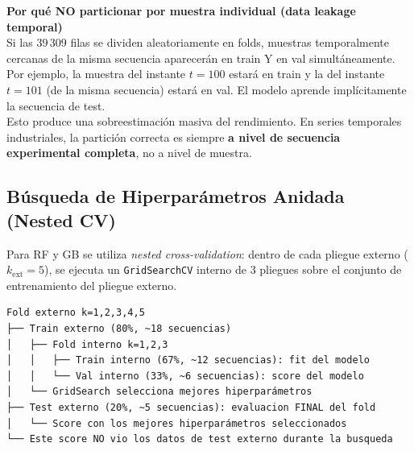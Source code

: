 \documentclass[12pt,a4paper]{article}
\begin{document}
\begin{advertenciabox}
\textbf{Por qu\'{e} NO particionar por muestra individual (data leakage temporal)}\\[4pt]
Si las 39\,309 filas se dividen aleatoriamente en folds, muestras temporalmente
cercanas de la misma secuencia aparecer\'{a}n en train Y en val simult\'{a}neamente.
Por ejemplo, la muestra del instante $t=100$ estar\'{a} en train y la del instante
$t=101$ (de la misma secuencia) estar\'{a} en val. El modelo aprende impl\'{i}citamente
la secuencia de test.\\[4pt]
Esto produce una sobreestimaci\'{o}n masiva del rendimiento. En series temporales
industriales, la partici\'{o}n correcta es siempre \textbf{a nivel de secuencia
experimental completa}, no a nivel de muestra.
\end{advertenciabox}

\subsection{B\'{u}squeda de Hiperpar\'{a}metros Anidada (Nested CV)}

Para RF y GB se utiliza \textit{nested cross-validation}: dentro de cada pliegue
externo ($k_{\text{ext}}=5$), se ejecuta un \texttt{GridSearchCV} interno de 3
pliegues sobre el conjunto de entrenamiento del pliegue externo.

\begin{center}
\begin{verbatim}
Fold externo k=1,2,3,4,5
├── Train externo (80%, ~18 secuencias)
│   ├── Fold interno k=1,2,3
│   │   ├── Train interno (67%, ~12 secuencias): fit del modelo
│   │   └── Val interno (33%, ~6 secuencias): score del modelo
│   └── GridSearch selecciona mejores hiperparámetros
├── Test externo (20%, ~5 secuencias): evaluacion FINAL del fold
│   └── Score con los mejores hiperparámetros seleccionados
└── Este score NO vio los datos de test externo durante la busqueda
\end{verbatim}
\end{center}
\end{document}
